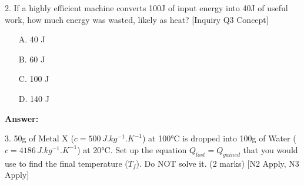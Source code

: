 \documentclass[11pt, a4paper]{article}
\begin{document}
2.  If a highly efficient machine converts 100J of input energy into 40J of useful work, how much energy was wasted, likely as heat? [Inquiry Q3 Concept]
    \begin{itemize}
        \item[A.] 40 J
        \item[B.] 60 J
        \item[C.] 100 J
        \item[D.] 140 J
    \end{itemize}
    \textbf{Answer:} \underline{\hspace{1cm}}

3.  50g of Metal X ($c = 500 \, \si{J.kg^{-1}.K^{-1}}$) at 100\si{\celsius} is dropped into 100g of Water ($c = 4186 \, \si{J.kg^{-1}.K^{-1}}$) at 20\si{\celsius}. Set up the equation $Q_{lost} = Q_{gained}$ that you would use to find the final temperature ($T_f$). Do NOT solve it. (2 marks) [N2 Apply, N3 Apply]
    \vspace{3cm}
\end{document}

